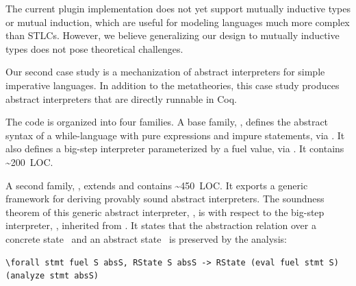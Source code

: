 The current plugin implementation does not yet support
mutually inductive types or mutual induction, which are
useful for modeling languages much more complex than STLCs.
However,
we believe generalizing our design to mutually inductive types does
not pose theoretical challenges.



Our second case study is a mechanization of abstract interpreters
for simple imperative languages.
In addition to the metatheories, this case study produces abstract
interpreters that are directly runnable in Coq.

The code is organized into four families.
A base family, , defines the abstract syntax of a while-language
with pure expressions and impure statements, via .
It also defines a big-step interpreter parameterized by a fuel value,
via .
It contains \textasciitilde 200~LOC.

A second family, , extends  and contains
\textasciitilde 450~LOC.
It exports a generic framework for deriving provably sound
abstract interpreters.
The soundness theorem of this generic abstract interpreter, ,
is with respect to the big-step interpreter, , inherited from .
It states that the abstraction relation  over a
concrete state~ and an abstract state~ is preserved
by the analysis:

\begin{centered}
\begin{minipage}{.86\textwidth}
\begin{lstlisting}[basicstyle=\fontsize{8.25}{9}\ttfamily]
\forall stmt fuel S absS, RState S absS -> RState (eval fuel stmt S) (analyze stmt absS)
\end{lstlisting}
\end{minipage}
\end{centered}

